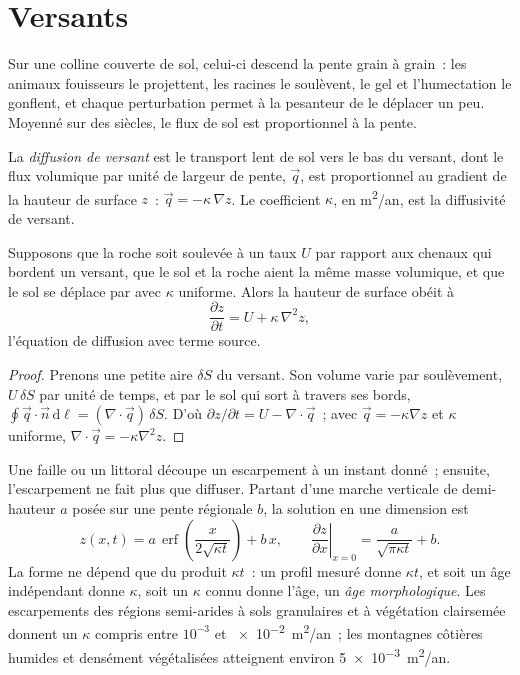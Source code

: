 \section{Versants}\label{sec:b3:quantitative-geomorphology:hillslopes}

Sur une colline couverte de sol, celui-ci descend la pente grain à grain~: les animaux fouisseurs
le projettent, les racines le soulèvent, le gel et l'humectation le gonflent, et chaque
perturbation permet à la pesanteur de le déplacer un peu. Moyenné sur des siècles, le
flux de sol est proportionnel à la pente.

\begin{definition}\label{def:b3:quantitative-geomorphology:diffusion}
La \emph{diffusion de versant} est le transport lent
de sol vers le bas du versant, dont le flux volumique par unité de largeur de pente,
$\vec q$, est proportionnel au gradient de la hauteur de surface $z$~:
$\vec q = -\kappa\,\nabla z$. Le coefficient $\kappa$, en
\unit{m^2/an}, est la diffusivité de versant.
\end{definition}

\begin{theorem}\label{thm:b3:quantitative-geomorphology:diffusion}
Supposons que la roche soit soulevée à un taux $U$ par rapport aux chenaux qui bordent un
versant, que le sol et la roche aient la même masse volumique, et que le sol se déplace par
 avec $\kappa$ uniforme. Alors la hauteur de surface obéit à
\[
\frac{\partial z}{\partial t} = U + \kappa\,\nabla^2 z ,
\]
l'équation de diffusion avec terme source.
\end{theorem}

\begin{proof}
Prenons une petite aire $\delta S$ du versant. Son volume varie par soulèvement,
$U\,\delta S$ par unité de temps, et par le sol qui sort à travers ses
bords, $\oint \vec q\cdot\vec n\,\mathrm{d}\ell = (\nabla\cdot\vec q)\,\delta S$.
D'où $\partial z/\partial t = U - \nabla\cdot\vec q$~; avec $\vec q = -\kappa
\nabla z$ et $\kappa$ uniforme, $\nabla\cdot\vec q = -\kappa\nabla^2 z$.
\end{proof}

Une faille ou un littoral découpe un escarpement à un instant donné~; ensuite, l'escarpement ne fait plus que
diffuser. Partant d'une marche verticale de demi-hauteur $a$ posée sur une pente
régionale $b$, la solution en une dimension est
\[
z(x,t) = a\,\operatorname{erf}\!\left(\frac{x}{2\sqrt{\kappa t}}\right) + b\,x ,
\qquad
\left.\frac{\partial z}{\partial x}\right|_{x=0} = \frac{a}{\sqrt{\pi\kappa t}} + b .
\]
La forme ne dépend que du produit $\kappa t$~: un profil mesuré donne
$\kappa t$, et soit un âge indépendant donne $\kappa$, soit un $\kappa$ connu donne
l'âge, un \emph{âge morphologique}. Les escarpements des régions semi-arides
à sols granulaires et à végétation clairsemée donnent un $\kappa$ compris entre
$10^{-3}$ et \qty{e-2}{m^2/an}~; les montagnes côtières humides et densément
végétalisées atteignent environ \qty{5e-3}{m^2/an}.

